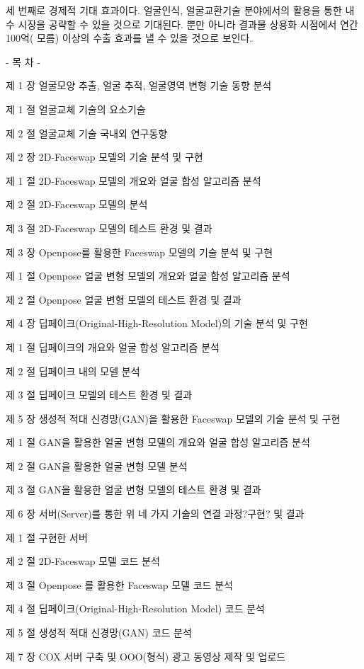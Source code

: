 \documentclass{oblivoir}
\begin{document}
세 번째로 경제적 기대 효과이다. 얼굴인식, 얼굴교환기술 분야에서의 활용을 통한 내수 시장을 공략할 수 있을 것으로 기대된다. 뿐만 아니라 결과물 상용화 시점에서 연간 100억(
모름) 이상의 수출 효과를 낼 수 있을 것으로 보인다.


-   목     차   -

제  1  장 얼굴모양 추출, 얼굴 추적, 얼굴영역 변형 기술 동향 분석

제  1  절 얼굴교체 기술의 요소기술

제  2  절 얼굴교체 기술 국내외 연구동향

제  2  장 2D-Faceswap 모델의 기술 분석 및 구현

제  1  절 2D-Faceswap 모델의 개요와 얼굴 합성 알고리즘 분석

제  2  절 2D-Faceswap 모델의 분석

제  3  절 2D-Faceswap 모델의 테스트 환경 및 결과

제  3  장 Openpose를 활용한 Faceswap 모델의 기술 분석 및 구현

제  1  절 Openpose 얼굴 변형 모델의 개요와 얼굴 합성 알고리즘 분석

제  2  절 Openpose 얼굴 변형 모델의 테스트 환경 및 결과

제  4  장 딥페이크(Original-High-Resolution Model)의 기술 분석 및 구현

제  1  절 딥페이크의 개요와 얼굴 합성 알고리즘 분석

제  2  절 딥페이크 내의 모델 분석

제  3  절 딥페이크 모델의 테스트 환경 및 결과

제  5  장 생성적 적대 신경망(GAN)을 활용한 Faceswap 모델의 기술 분석 및 구현

제  1  절 GAN을 활용한 얼굴 변형 모델의 개요와 얼굴 합성 알고리즘 분석

제  2  절 GAN을 활용한 얼굴 변형 모델 분석

제  3  절 GAN을 활용한 얼굴 변형 모델의 테스트 환경 및 결과

제  6  장 서버(Server)를 통한 위 네 가지 기술의  연결 과정?구현? 및 결과  

제  1  절 구현한 서버 

제  2  절 2D-Faceswap 모델 코드 분석

제  3  절 Openpose 를 활용한 Faceswap 모델 코드 분석

제  4  절 딥페이크(Original-High-Resolution Model) 코드 분석

제  5  절 생성적 적대 신경망(GAN) 코드 분석

제  7  장 COX 서버 구축 및 OOO(형식) 광고 동영상 제작 및 업로드
\end{document}
